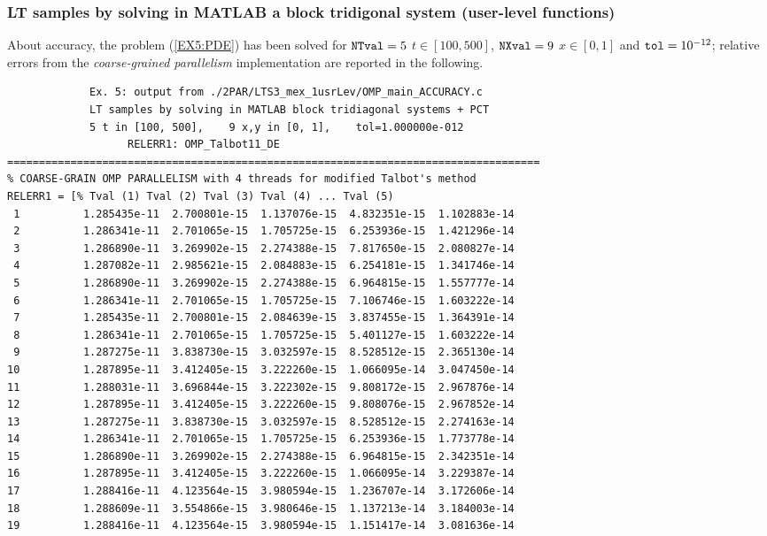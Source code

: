 \documentclass[a4paper,10pt]{report}%
\begin{document}
\subsubsection{LT samples by solving in MATLAB a block tridigonal system (user-level functions)}
About accuracy, the problem (\ref{EX5:PDE}) has been solved for ${\tt NTval}=5$ $t\in[100, 500]$,
${\tt NXval}=9$ $x\in[0,1]$ and ${\tt tol}=10^{-12}$; relative errors from the {\em coarse-grained parallelism}
implementation are reported in the following.
\begin{lstlisting}
             Ex. 5: output from ./2PAR/LTS3_mex_1usrLev/OMP_main_ACCURACY.c
             LT samples by solving in MATLAB block tridiagonal systems + PCT
             5 t in [100, 500],    9 x,y in [0, 1],    tol=1.000000e-012
                   RELERR1: OMP_Talbot11_DE
====================================================================================
% COARSE-GRAIN OMP PARALLELISM with 4 threads for modified Talbot's method
RELERR1 = [% Tval (1) Tval (2) Tval (3) Tval (4) ... Tval (5)
 1          1.285435e-11  2.700801e-15  1.137076e-15  4.832351e-15  1.102883e-14
 2          1.286341e-11  2.701065e-15  1.705725e-15  6.253936e-15  1.421296e-14
 3          1.286890e-11  3.269902e-15  2.274388e-15  7.817650e-15  2.080827e-14
 4          1.287082e-11  2.985621e-15  2.084883e-15  6.254181e-15  1.341746e-14
 5          1.286890e-11  3.269902e-15  2.274388e-15  6.964815e-15  1.557777e-14
 6          1.286341e-11  2.701065e-15  1.705725e-15  7.106746e-15  1.603222e-14
 7          1.285435e-11  2.700801e-15  2.084639e-15  3.837455e-15  1.364391e-14
 8          1.286341e-11  2.701065e-15  1.705725e-15  5.401127e-15  1.603222e-14
 9          1.287275e-11  3.838730e-15  3.032597e-15  8.528512e-15  2.365130e-14
10          1.287895e-11  3.412405e-15  3.222260e-15  1.066095e-14  3.047450e-14
11          1.288031e-11  3.696844e-15  3.222302e-15  9.808172e-15  2.967876e-14
12          1.287895e-11  3.412405e-15  3.222260e-15  9.808076e-15  2.967852e-14
13          1.287275e-11  3.838730e-15  3.032597e-15  8.528512e-15  2.274163e-14
14          1.286341e-11  2.701065e-15  1.705725e-15  6.253936e-15  1.773778e-14
15          1.286890e-11  3.269902e-15  2.274388e-15  6.964815e-15  2.342351e-14
16          1.287895e-11  3.412405e-15  3.222260e-15  1.066095e-14  3.229387e-14
17          1.288416e-11  4.123564e-15  3.980594e-15  1.236707e-14  3.172606e-14
18          1.288609e-11  3.554866e-15  3.980646e-15  1.137213e-14  3.184003e-14
19          1.288416e-11  4.123564e-15  3.980594e-15  1.151417e-14  3.081636e-14

\end{lstlisting}
\end{document}
